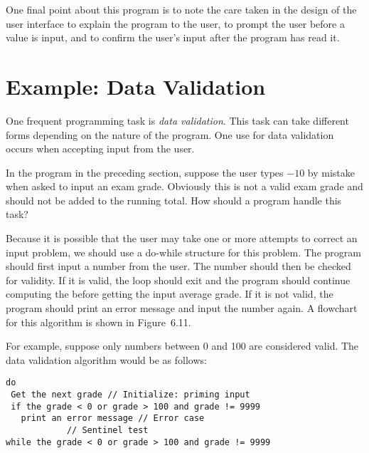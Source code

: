 One final point about this program is to note the care taken in the
design of the user interface to explain the program to the user, to
prompt the user before a value is input, and to confirm the user's
input after the program has read it.


\section{Example: Data Validation}
\label{example-data-validation}
\noindent One frequent programming task is {\it data validation}. This
task can take different forms depending on the nature of the
program. One use for data validation occurs when accepting input from
the user.

In the program in the preceding section, suppose the user types $-10$
by mistake when asked to input an exam grade. Obviously this is not a
valid exam grade and should not be added to the running total. How
should a program handle this task?

Because it is possible that the user may take one or more attempts
to correct an input problem, we should use a do-while structure for
this problem.  The program should first input a number from the
user. The number should then be checked for validity. If it is valid,
the loop should exit and the program should continue computing the
before getting the input average grade. If it is not valid, the
program should print an error message and input the number again. A
flowchart for this algorithm is shown in Figure~6.11.

For example, suppose only numbers between 0 and 100 are considered
valid. The data validation algorithm would be as follows:

\begin{jjjlisting}
\begin{lstlisting}
do
 Get the next grade // Initialize: priming input
 if the grade < 0 or grade > 100 and grade != 9999
   print an error message // Error case
            // Sentinel test
while the grade < 0 or grade > 100 and grade != 9999 
\end{lstlisting}
\end{jjjlisting}

